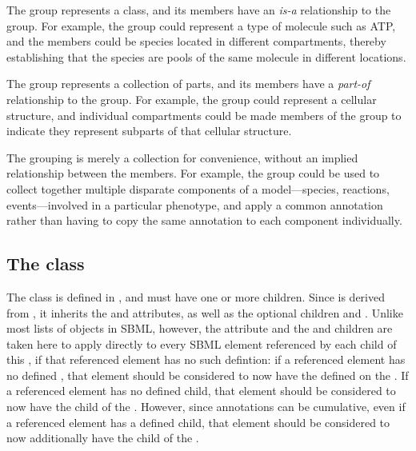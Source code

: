 \begin{description}[font=\normalfont\ttfamily\color{black},style=nextline]

\item[\token{classification}] The group represents a class, and its members have an \emph{is-a} relationship to the group.  For example, the group could represent a type of molecule such as ATP, and the members could be species located in different compartments, thereby establishing that the species are pools of the same molecule in different locations.

\item[\token{partonomy}] The group represents a collection of parts, and its members have a \emph{part-of} relationship to the group.  For example, the group could represent a cellular structure, and individual compartments could be made members of the group to indicate they represent subparts of that cellular structure.

\item[\token{collection}] The grouping is merely a collection for convenience, without an implied relationship between the members.  For example, the group could be used to collect together multiple disparate components of a model---species, reactions, events---involved in a particular phenotype, and apply a common annotation rather than having to copy the same annotation to each component individually.

\end{description}

\subsection{The  class}
\label{listofmembers-class}

The \ListOfMembers class is defined in , and must have one or more \Member children.  Since \ListOfMembers is derived from \SBase, it inherits the  and  attributes, as well as the optional children \Notes and \Annotation.  Unlike most lists of objects in SBML, however, the  attribute and the \Notes and \Annotation children are taken here to apply directly to every SBML element referenced by each child \Member of this \ListOfMembers, if that referenced element has no such defintion: if a referenced element has no defined , that element should be considered to now have the  defined on the \ListOfMembers.  If a referenced element has no defined \Notes child, that element should be considered to now have the \Notes child of the \ListOfMembers.  However, since annotations can be cumulative, even if a referenced element has a defined \Annotation child, that element should be considered to now additionally have the \Annotation child of the \ListOfMembers.

